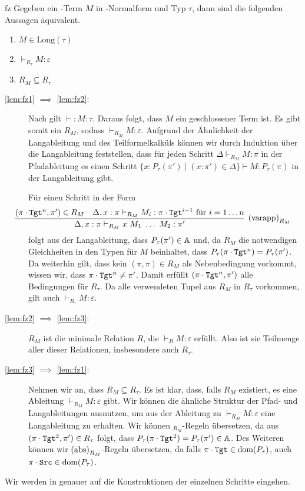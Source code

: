 \begin{lemma}{}{fz}
Gegeben ein \tlambda-Term $M$ in \tbeta-Normalform und Typ $\tau$, dann sind die folgenden Aussagen äquivalent.
\begin{enumerate}
    \item $M\in \text{Long}(\tau)$\label{lem:fz1}
    \item $\vdash_{R_\tau} M :\varepsilon$ \label{lem:fz2}
    \item $R_M\subseteq R_\tau$ \label{lem:fz3}
\end{enumerate}
\Proofidea
\begin{description}
    \item[\ref{lem:fz1} $\implies$ \ref{lem:fz2}:] Nach  gilt $\vdash: M :\tau$. Daraus folgt, dass $M$ ein geschlossener Term ist. Es gibt somit ein $R_M$, sodass $\vdash_{R_M} M : \varepsilon$. Aufgrund der Ähnlichkeit der Langableitung und des Teilformelkalküls können wir durch Induktion über die Langableitung feststellen, dass für jeden Schritt $\Delta\vdash_{R_M} M : \pi$ in der Pfadableitung es einen Schritt $\{x : P_\tau(\pi') \mid (x : \pi')\in\Delta\}\vdash M : P_\tau(\pi)$ in der Langableitung gibt.
    
    Für einen Schritt in der Form \[\hspace{-1cm}\infer[\varapp_{R_M}]{\Delta, x:\pi\vdash_{R_M} x~M_1~\ldots~M_2 : \pi'}{(\pi\cdot\tgt^n, \pi')\in R_M & \Delta,x:\pi\vdash_{R_M} M_i : \pi\cdot\tgt^{i-1} \text{ für } i=1\ldots n}\] folgt aus der Langableitung, dass $P_\tau(\pi')\in\mathbb{A}$ und, da $R_M$ die notwendigen Gleichheiten in den Typen für $M$ beinhaltet, dass $P_\tau(\pi\cdot\texttt{Tgt}^n) = P_\tau(\pi')$. Da weiterhin gilt, dass kein $(\pi,\pi)\in R_M$ als Nebenbedingung vorkommt, wissen wir, dass $\pi\cdot\texttt{Tgt}^n\neq\pi'$. Damit erfüllt $(\pi\cdot\texttt{Tgt}^n,\pi')$ alle Bedingungen für $R_\tau$. Da alle verwendeten Tupel aus $R_M$ in $R_\tau$ vorkommen, gilt auch $\vdash_{R_\tau} M : \varepsilon$.
    \item[\ref{lem:fz2} $\implies$ \ref{lem:fz3}:] $R_M$ ist die minimale Relation $R$, die $\vdash_R M : \varepsilon$ erfüllt. Also ist sie Teilmenge aller dieser Relationen, insbesondere auch $R_\tau$.
    \item[\ref{lem:fz3} $\implies$ \ref{lem:fz1}:] Nehmen wir an, dass $R_M\subseteq R_\tau$. Es ist klar, dass, falls $R_M$ existiert, es eine Ableitung $\vdash_{R_M} M : \varepsilon$ gibt. Wir können die ähnliche Struktur der Pfad- und Langableitungen ausnutzen, um aus der Ableitung zu $\vdash_{R_M} M : \varepsilon$ eine Langableitung zu erhalten. 
    Wir können \varapp$_{R_M}$-Regeln übersetzen, da aus $(\pi\cdot\texttt{Tgt}^2, \pi')\in R_\tau$ folgt, dass $P_\tau(\pi\cdot\texttt{Tgt}^2) = P_\tau(\pi') \in\mathbb{A}$. Des Weiteren können wir $\text{(abs)}_{R_M}$-Regeln übersetzen, da falls $\pi\cdot\texttt{Tgt}\in\text{dom}(P_\tau)$, auch $\pi\cdot\texttt{Src}\in\text{dom}(P_\tau)$.
\end{description}
Wir werden in  genauer auf die Konstruktionen der einzelnen Schritte eingehen.
\end{lemma}

